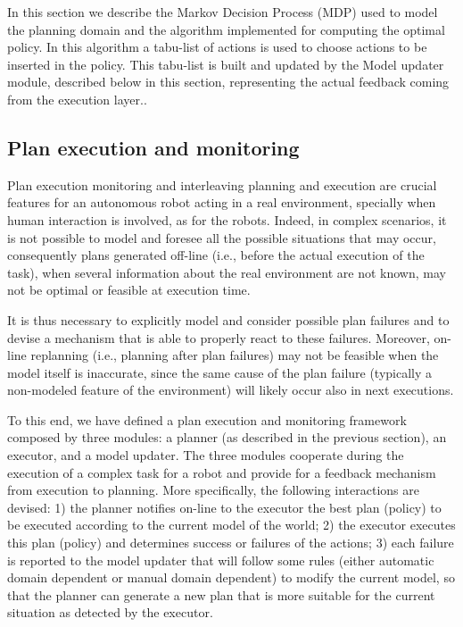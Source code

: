 In this section we describe the Markov Decision Process (MDP) used to model the \coaches planning domain and the algorithm implemented for computing the optimal policy.
In this algorithm a tabu-list of actions is used to choose actions to be inserted in the policy.
This tabu-list is built and updated by the Model updater module, described below in this section, representing the actual feedback coming from the execution layer..







\subsection{Plan execution and monitoring}


Plan execution monitoring and interleaving planning and execution are crucial features for an autonomous robot acting in a real environment, specially when human interaction is involved, 
as for the \coaches robots. Indeed, in complex scenarios, it is not possible to model and foresee all the possible situations that may occur, consequently plans generated off-line (i.e., before the actual execution of the task), when several information about the real environment are not known, may not be optimal or feasible at execution time.

It is thus necessary to explicitly model and consider possible plan failures and to devise a mechanism that is able to properly react to these failures. Moreover, on-line replanning (i.e., planning after plan failures) may not be feasible when the model itself is inaccurate, since the same cause of the plan failure (typically a non-modeled feature of the environment) will likely occur also in next executions.

To this end, we have defined a plan execution and monitoring framework composed by three modules: a planner (as described in the previous section), an executor, and a model updater. The three modules cooperate during the execution of a complex task for a robot and provide for a feedback mechanism from execution to planning.
More specifically, the following interactions are devised:
1) the planner notifies on-line to the executor the best plan (policy) to be executed according to the current model of the world; 2) the executor executes this plan (policy) and determines success or failures of the actions; 3) each failure is reported to the model updater that will follow some rules (either automatic domain dependent or manual domain dependent) to modify the current model, so that the planner can generate a new plan that is more suitable for the current situation as detected by the executor.

